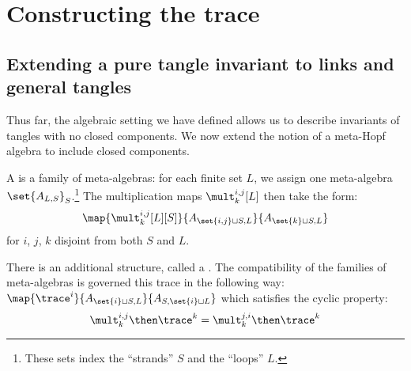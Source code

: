 \chapter{Constructing the trace}
\section{Extending a pure tangle invariant to links and general tangles}
Thus far, the algebraic setting we have defined allows us to describe invariants
of tangles with no closed components. We now extend the notion of a meta-Hopf
algebra to include closed components.

\begin{definition}
        A  is a family of meta-algebras: for each
        finite set $L$, we assign one meta-algebra $\set{A_{L,
        S}}_S$.\footnote{These sets index the \enquote{strands} $S$ and the
        \enquote{loops} $L$.} The multiplication maps $\mult^{i,j}_k[L]$ then
        take the form:
        \begin{equation}
                \map {\mult^{i,j}_k[L][S]}
                        {A_{\set{i,j}\sqcup S, L}}
                        {A_{\set{k}\sqcup S, L}} 
        \end{equation}
        for $i$, $j$, $k$ disjoint from both $S$ and $L$.

        There is an additional structure, called a . The
        compatibility of the families of meta-algebras is governed this trace in
        the following way:
        $\map {\trace^i} {A_{\set{i}\sqcup S, L}} {A_{S,\set{i}\sqcup L}}$ which
        satisfies the cyclic property:
        \begin{equation}
                \mult^{i,j}_{k}\then\trace^k
                =
                \mult^{j,i}_{k}\then\trace^k
        \end{equation}
\end{definition}



